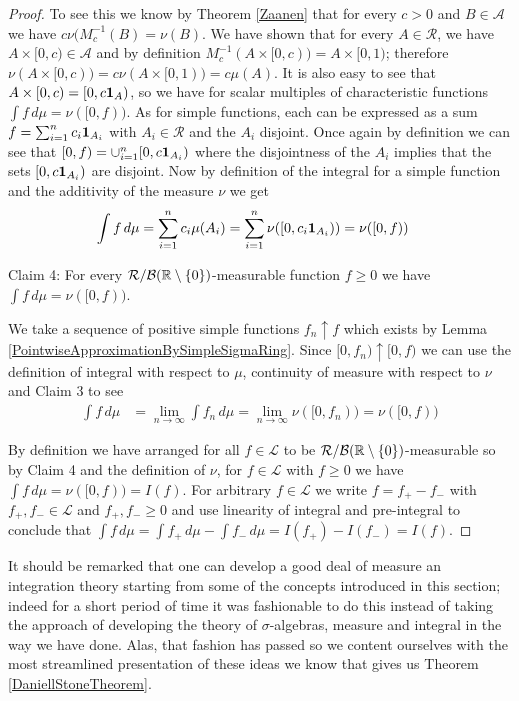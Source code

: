 \documentclass{amsart}
\theoremstyle{remark}
\theoremstyle{definition}
\begin{document}
\begin{proof}
To see this we know by Theorem \ref{Zaanen} that for every $c > 0$ and
$B \in \mathcal{A}$ we have $c \nu(M_c^{-1}(B) = \nu(B)$.  We have
shown that for every $A \in \mathcal{R}$, we have $A \times [0,c) \in
\mathcal{A}$ and by definition $M_c^{-1}(A \times [0,c)) = A \times
[0,1)$; therefore $\nu(A \times [0,c)) = c \nu(A \times [0,1)) = c
\mu(A)$. It is also easy to see that $A \times [0,c) = [0,
c\textbf{1}_{A})$, so we have for scalar multiples of
characteristic functions $\int f \, d\mu = \nu([0,f))$.  As for simple
functions, each can be expressed as a sum $f = \sum_{i=1}^n c_i
\textbf{1}_{A_i}$ with $A_i \in \mathcal{R}$ and the $A_i$
disjoint.  Once again by definition we can see that $[0,f) =
\cup_{i=1}^n [0, c \textbf{1}_{A_i})$ where the disjointness of
the $A_i$ implies that the sets $ [0, c \textbf{1}_{A_i})$ are
disjoint.  Now by definition of the integral for a simple function and
the additivity of the measure $\nu$ we get
\begin{align*}
\int f \, d \mu &= \sum_{i=1}^n c_i \mu(A_i) = \sum_{i=1}^n \nu([0,c_i
\textbf{1}_{A_i})) = \nu([0,f))
\end{align*}

Claim 4: For every $\mathcal{R}/\mathcal{B}(\mathbb{R} \setminus \lbrace 0
\rbrace)$-measurable function $f \geq 0$ we have $\int f \, d\mu =
\nu([0,f))$.

We take a sequence of positive simple functions $f_n \uparrow f$ which
exists by Lemma \ref{PointwiseApproximationBySimpleSigmaRing}.
Since $[0,f_n) \uparrow [0,f)$ we can use the definition of integral
with respect to $\mu$, continuity of measure with respect to $\nu$ and
Claim 3 to see
\begin{align*}
\int f \, d \mu &= \lim_{n \to \infty} \int f_n \, d\mu = \lim_{n \to
  \infty} \nu([0,f_n)) = \nu([0,f))
\end{align*}

By definition we have arranged for all $f \in
\mathcal{L}$ to be $\mathcal{R}/\mathcal{B}(\mathbb{R} \setminus \lbrace 0
\rbrace)$-measurable so by Claim 4 and the definition of $\nu$, for $f
\in \mathcal{L}$ with $f \geq 0$ we have $\int f \, d \mu = \nu([0,f))
= I(f)$.  For arbitrary $f \in \mathcal{L}$ we write $f = f_+ - f_-$
with $f_+, f_- \in \mathcal{L}$ and $f_+, f_- \geq 0$ and use
linearity of integral and pre-integral to conclude that $\int f \, d
\mu = \int f_+ \, d\mu - \int f_- \, d\mu = I(f_+) - I(f_-) = I(f)$.
\end{proof}

It should be remarked that one can develop a good deal of measure an
integration theory starting from some of the concepts introduced in
this section; indeed for a short period of time it was fashionable to
do this instead of taking the approach of developing the theory of
$\sigma$-algebras, measure and integral in the way we have done.
Alas, that fashion has passed so we content ourselves with the most
streamlined presentation of these ideas we know that gives us Theorem \ref{DaniellStoneTheorem}.
\end{document}
